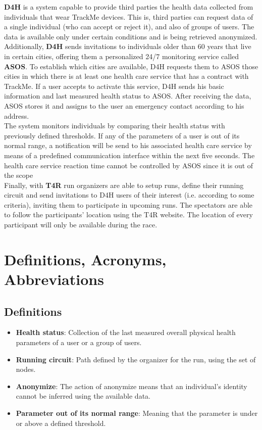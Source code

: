 \documentclass[a4paper, hidelinks, 12pt]{report}
\begin{document}
	\textbf{D4H} is a system capable to provide third parties the health data collected from individuals that wear TrackMe devices. This is, third parties can request data of a single individual (who can accept or reject it), and also of groups of users. The data is available only  under certain conditions and is being retrieved anonymized.\\
	
	Additionally, \textbf{D4H} sends invitations to individuals older than 60 years that live in certain cities, offering them a personalized 24/7 monitoring service called \textbf{ASOS}. To establish which cities are available, D4H requests them to ASOS those cities in which there is at least one health care service that has a contract with TrackMe. If a user accepts to activate this service, D4H sends his basic information and last measured health status to ASOS. After receiving the data, ASOS stores it and assigns to the user an emergency contact according to his address. \\
			
	The system monitors individuals by comparing their health status with previously defined thresholds. If any of the parameters of a user is out of its normal range, a notification will be send to his associated health care service by means of a predefined communication
interface within the next five seconds. The health care service reaction time cannot be controlled by ASOS since it is out of the scope \\
	
	Finally, with \textbf{T4R} run organizers are able to setup runs, define their running circuit and send invitations to D4H users of their interest (i.e. according to some criteria), inviting them to participate in upcoming runs. The spectators are able to follow the participants' location using the T4R website. The location of every participant will only be available during the race.
	
	\section{Definitions, Acronyms, Abbreviations}
	\subsection{Definitions}
	\begin{itemize}
		\item{\textbf{Health status}}: Collection of the last measured overall physical health parameters of a user or a group of users.
		\item{\textbf{Running circuit}}: Path defined by the organizer for the run, using the set of nodes.
		\item{\textbf{Anonymize}}: The action of anonymize means that an individual’s identity cannot
be inferred using the available data.
		\item{\textbf{Parameter out of its normal range}}: Meaning that the parameter is under or above a defined threshold. 
	\end{itemize}
	
\end{document}
